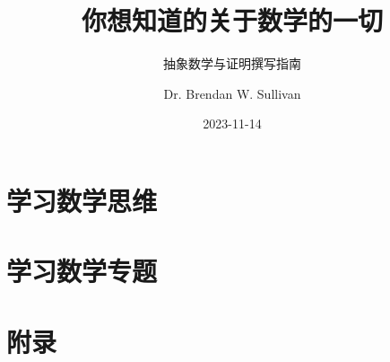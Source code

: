 \documentclass[lang=cn,color=green,12pt]{elegantbook}
\title{你想知道的关于数学的一切}
\subtitle{抽象数学与证明撰写指南}
\author{Dr. Brendan W. Sullivan}
\date{2023-11-14}
\begin{document}
\maketitle
\frontmatter

\tableofcontents

\mainmatter

\part{学习数学思维}\label{part:Part One}








\part{学习数学专题}\label{part:Part Two}





\appendix

\part{附录}\label{part:Appendix}




\end{document}
